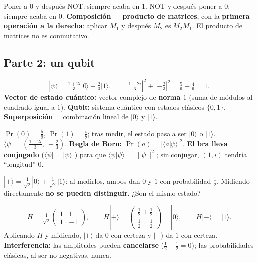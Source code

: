 \documentclass[11pt, a4paper, twoside, openright]{report}
\begin{document}
{Poner a $0$ y después NOT: siempre acaba en $1$. \quad NOT y después poner a $0$: siempre acaba en $0$.}
{\textbf{Composición = producto de matrices}, con la \textbf{primera operación a la derecha}: aplicar $M_1$ y después $M_2$ es $M_2M_1$. El producto de matrices no es conmutativo.}

\subsection{Parte 2: un qubit}

{\[ |\psi\rangle = \tfrac{1+2i}{3}|0\rangle - \tfrac23|1\rangle, \qquad \left|\tfrac{1+2i}{3}\right|^2 + \left|-\tfrac23\right|^2 = \tfrac59 + \tfrac49 = 1. \]}
{\textbf{Vector de estado cuántico:} vector complejo de \textbf{norma $1$} (suma de módulos al cuadrado igual a $1$). \textbf{Qubit:} sistema cuántico con estados clásicos $\{0,1\}$. \textbf{Superposición} = combinación lineal de $|0\rangle$ y $|1\rangle$.}

{$\Pr(0) = \frac59$, \quad $\Pr(1) = \frac49$; \quad tras medir, el estado pasa a ser $|0\rangle$ o $|1\rangle$. \quad $\langle\psi| = \left(\tfrac{1-2i}{3},\ -\tfrac23\right)$.}
{\textbf{Regla de Born:} $\Pr(a) = |\langle a|\psi\rangle|^2$. \textbf{El bra lleva conjugado} ($\langle\psi| = |\psi\rangle^\dagger$) para que $\langle\psi|\psi\rangle = \|\psi\|^2$; sin conjugar, $(1,i)$ tendría ``longitud'' $0$.}

{$|\pm\rangle = \tfrac{1}{\sqrt2}|0\rangle \pm \tfrac{1}{\sqrt2}|1\rangle$: \quad al medirlos, ambos dan $0$ y $1$ con probabilidad $\frac12$.}
{Midiendo directamente \textbf{no se pueden distinguir}. ¿Son el mismo estado?}

{\[ H = \tfrac{1}{\sqrt2}\begin{pmatrix}1&1\\1&-1\end{pmatrix}, \qquad H|+\rangle = \begin{pmatrix}\frac12 + \frac12\\[1mm] \frac12 - \frac12\end{pmatrix} = |0\rangle, \qquad H|-\rangle = |1\rangle. \]}
{Aplicando $H$ y midiendo, $|+\rangle$ da $0$ con certeza y $|-\rangle$ da $1$ con certeza. \textbf{Interferencia:} las amplitudes pueden \textbf{cancelarse} ($\frac12 - \frac12 = 0$); las probabilidades clásicas, al ser no negativas, nunca.}
\end{document}
